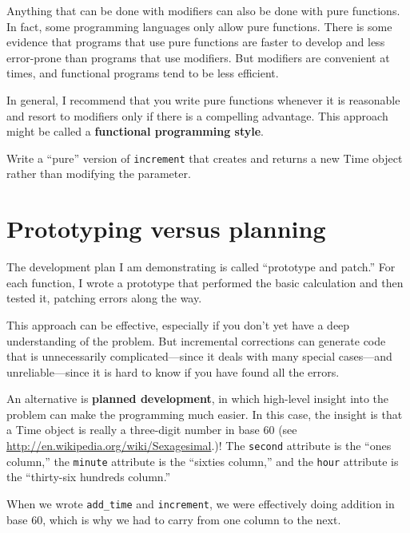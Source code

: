 \documentclass[10pt]{book}
\begin{document}
Anything that can be done with modifiers can also be done with pure
functions.  In fact, some programming languages only allow pure
functions.  There is some evidence that programs that use pure
functions are faster to develop and less error-prone than programs
that use modifiers.  But modifiers are convenient at times,
and functional programs tend to be less efficient.

In general, I recommend that you write pure functions whenever it is
reasonable and resort to modifiers only if there is a compelling
advantage.  This approach might be called a {\bf functional
programming style}.


\begin{exercise}

Write a ``pure'' version of {\tt increment} that creates and returns
a new Time object rather than modifying the parameter.

\end{exercise}


\section{Prototyping versus planning}
\label{prototype}

The development plan I am demonstrating is called ``prototype and
patch.''  For each function, I wrote a prototype that performed the
basic calculation and then tested it, patching errors along the
way.

This approach can be effective, especially if you don't yet have a
deep understanding of the problem.  But incremental corrections can
generate code that is unnecessarily complicated---since it deals with
many special cases---and unreliable---since it is hard to know if you
have found all the errors.

An alternative is {\bf planned development}, in which high-level
insight into the problem can make the programming much easier.  In
this case, the insight is that a Time object is really a three-digit
number in base 60 (see \url{http://en.wikipedia.org/wiki/Sexagesimal}.)!  The
{\tt second} attribute is the ``ones column,'' the {\tt minute}
attribute is the ``sixties column,'' and the {\tt hour} attribute is
the ``thirty-six hundreds column.''

When we wrote \verb"add_time" and {\tt increment}, we were effectively
doing addition in base 60, which is why we had to carry from one
column to the next.
\end{document}
